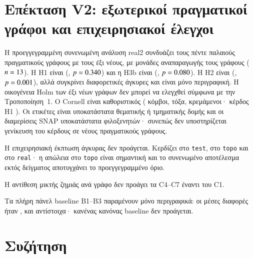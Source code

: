 \documentclass[11pt,a4paper]{article}
\theoremstyle{definition}
\theoremstyle{remark}
\begin{document}
\FloatBarrier
\section{Επέκταση V2: εξωτερικοί πραγματικοί γράφοι και επιχειρησιακοί έλεγχοι}
\label{sec:v2extension}

Η προεγγεγραμμένη συνενωμένη ανάλυση real2 συνδυάζει τους πέντε παλαιούς πραγματικούς
γράφους με τους έξι νέους, με μονάδες αναπαραγωγής τους γράφους
($n=13$). Η H1 είναι \VTwoRealHone{} (\VTwoRealHoneWins{}, $p=0.340$)
και η H3b είναι \VTwoRealHthree{} (\VTwoRealHthreeWins{}, $p=0.080$).
Η H2 είναι \VTwoRealHtwo{} (\VTwoRealHtwoWins{}, $p=0.001$), αλλά συγκρίνει
διαφορετικές άγκυρες και είναι μόνο περιγραφική. Η οικογένεια Holm των έξι νέων
γράφων δεν μπορεί να ελεγχθεί σύμφωνα με την Τροποποίηση~1. Ο Cornell είναι
καθοριστικός (\VTwoCornellN{} κόμβοι, \VTwoCornellM{} τόξα, \VTwoCornellDang{} κρεμάμενοι·
κέρδος H1 \VTwoCornellHone{}).
Οι ετικέτες είναι υποκατάστατα θεματικής ή τμηματικής δομής και οι διαμερίσεις
SNAP υποκατάστατα φιλοξενητών· συνεπώς δεν υποστηρίζεται γενίκευση του κέρδους
σε νέους πραγματικούς γράφους.



Η επιχειρησιακή έκπτωση άγκυρας δεν προάγεται. Κερδίζει
\VTwoAnchorTest{} στο \texttt{test}, \VTwoAnchorTopo{} στο \texttt{topo} και
\VTwoAnchorReal{} στο \texttt{real}· η απώλεια στο \texttt{topo} είναι σημαντική
και το συνενωμένο αποτέλεσμα εκτός δείγματος αποτυγχάνει το προεγγεγραμμένο όριο.


Η αντίθεση μικτής ζημιάς ανά γράφο δεν προάγει τα C4--C7 έναντι του C1.

Τα πλήρη πάνελ baseline B1--B3 παραμένουν μόνο περιγραφικά: οι μέσες
διαφορές ήταν \VTwoBOneMean{}, \VTwoBTwoMean{} και \VTwoBThreeMean{}
αντίστοιχα· κανένας κανόνας baseline δεν προάγεται.

\FloatBarrier
\section{Συζήτηση}
\label{sec:discussion}
\end{document}
